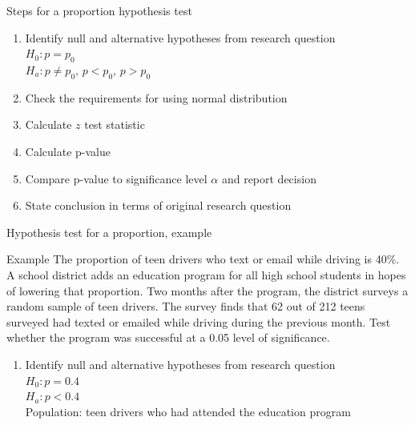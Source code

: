 \documentclass[xcolor=table, handout]{beamer}
\begin{document}
\begin{frame}{Steps for a proportion hypothesis test}
\begin{block}{}
\large
\begin{enumerate}
\item Identify null and alternative hypotheses from research question\\
$H_0: p = p_0$\\
$H_a: p \ne p_0, \, p < p_0, \, p> p_0$
\item Check the requirements for using normal distribution
\item Calculate $z$ test statistic
\item Calculate p-value
\item Compare p-value to significance level $\alpha$ and report decision
\item State conclusion in terms of original research question
\end{enumerate}
\end{block}
\end{frame}


\begin{frame}{Hypothesis test for a proportion, example}
\begin{exampleblock}{Example}
\large
The proportion of teen drivers who text or email while driving is 40\%. A school district adds an education program for all high school students in hopes of lowering that proportion. Two months after the program, the district surveys a random sample of teen drivers. The survey finds that 62 out of 212 teens surveyed had texted or emailed while driving during the previous month. Test whether the program was successful at a 0.05 level of significance.
\begin{enumerate}
\pause\item Identify null and alternative hypotheses from research question\\
\pause$H_0: p = 0.4$\\
$H_a: p < 0.4$\\
Population: teen drivers who had attended the education program
\end{enumerate}
\end{exampleblock}
\end{frame}
\end{document}

